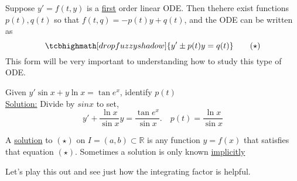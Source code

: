 Suppose $y' = f(t, y)$ is a \underline{first} order linear ODE. Then thehere exist functions $p(t), q(t)$ so that $f(t, q) = -p(t)y + q(t)$, and the ODE can be written as
\begin{equation*}
\tcbhighmath[drop fuzzy shadow]{y' \pm p(t)y = q(t)} \tag{$\star$}
\end{equation*}
This form will be very important to understanding how to study this type of ODE.

\begin{example-N}
	Given $y'\sin x  + y\ln x = \tan e^x$, identify $p(t)$\\
	\underline{Solution:} Divide by $sinx$ to set,
	\begin{equation*}
		y' + \dfrac{\ln x}{\sin x}y = \dfrac{\tan e^x}{\sin x}. \quad \boxed{p(t) = \dfrac{\ln x}{\sin x}}
	\end{equation*}
\end{example-N}

\begin{definition-N}
	A \underline{solution} to $(\star)$ on $I = (a,b) \subset \mathbb{R}$ is any function $y = f(x)$ that satisfies that equation $(\star)$.
	Sometimes a solution is only known \underline{implicitly}
\end{definition-N}

Let's play this out and see just how the integrating factor is helpful.
